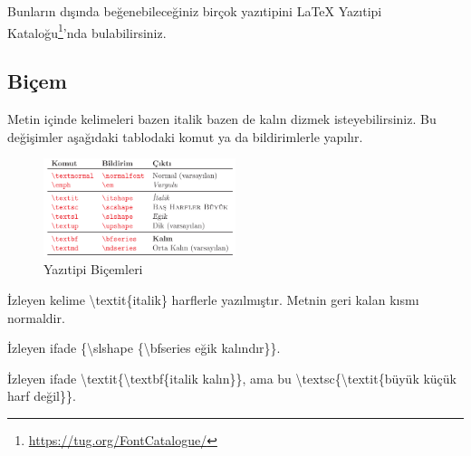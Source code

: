 \documentclass[
  10pt,
]{scrbook}
\newenvironment{Shaded}{\begin{snugshade}}{\end{snugshade}}
\newcommand{\FunctionTok}[1]{\textcolor[rgb]{0.00,0.00,0.00}{#1}}
\newcommand{\NormalTok}[1]{#1}
\renewcommand{\href}[2]{#2\footnote{\url{#1}}}
\theoremstyle{definition}
\theoremstyle{definition}
\theoremstyle{definition}
\theoremstyle{definition}
\theoremstyle{remark}
\begin{document}
Bunların dışında beğenebileceğiniz birçok yazıtipini \href{https://tug.org/FontCatalogue/}{LaTeX Yazıtipi Kataloğu}'nda bulabilirsiniz.

\hypertarget{biuxe7em}{%
\subsection{Biçem}\label{biuxe7em}}

Metin içinde kelimeleri bazen italik bazen de kalın dizmek isteyebilirsiniz. Bu değişimler aşağıdaki tablodaki komut ya da bildirimlerle yapılır.

\begin{figure}
\centering
\includegraphics[width=0.5\textwidth,height=\textheight]{images/yazitipi7.png}
\caption{Yazıtipi Biçemleri}
\end{figure}

\begin{Shaded}
\begin{Highlighting}[]
\NormalTok{İzleyen kelime }\FunctionTok{\textbackslash{}textit}\NormalTok{\{italik\} }
\NormalTok{harflerle yazılmıştır.}
\NormalTok{Metnin geri kalan kısmı}
\NormalTok{normaldir.}
\end{Highlighting}
\end{Shaded}

\begin{Shaded}
\begin{Highlighting}[]
\NormalTok{İzleyen ifade \{}\FunctionTok{\textbackslash{}slshape}\NormalTok{ \{}\FunctionTok{\textbackslash{}bfseries}\NormalTok{ eğik kalındır\}\}.}
\end{Highlighting}
\end{Shaded}

\begin{Shaded}
\begin{Highlighting}[]
\NormalTok{İzleyen ifade }\FunctionTok{\textbackslash{}textit}\NormalTok{\{}\FunctionTok{\textbackslash{}textbf}\NormalTok{\{italik kalın\}\}, ama bu}
\FunctionTok{\textbackslash{}textsc}\NormalTok{\{}\FunctionTok{\textbackslash{}textit}\NormalTok{\{büyük küçük harf değil\}\}.}
\end{Highlighting}
\end{Shaded}
\end{document}
